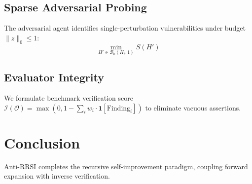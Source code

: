 \documentclass[11pt,a4paper]{article}
\begin{document}
\subsection{Sparse Adversarial Probing}
The adversarial agent identifies single-perturbation vulnerabilities under budget $\|z\|_0 \le 1$:
\begin{equation}
\min_{H' \in \mathcal{B}_0(H_t, 1)} S(H')
\end{equation}

\subsection{Evaluator Integrity}
We formulate benchmark verification score $\mathcal{I}(\mathcal{O}) = \max(0, 1 - \sum_i w_i \cdot \mathbf{1}[\text{Finding}_i])$ to eliminate vacuous assertions.

\section{Conclusion}
Anti-RRSI completes the recursive self-improvement paradigm, coupling forward expansion with inverse verification.
\end{document}
